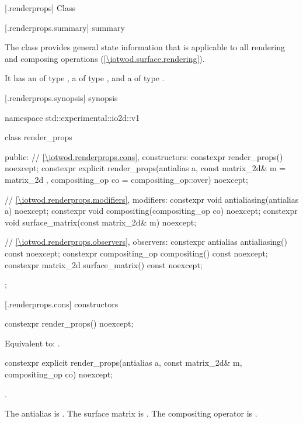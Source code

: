 
 [\iotwod.renderprops] {Class }

 [\iotwod.renderprops.summary] { summary}

\pnum
The  class provides general state information that is applicable to all rendering and composing operations (\ref{\iotwod.surface.rendering}).

\pnum
It has an  of type , a  of type , and a  of type .

 [\iotwod.renderprops.synopsis] { synopsis}

\begin{codeblock}
namespace std::experimental::io2d::v1 {
  class render_props {
  public:
    // \ref{\iotwod.renderprops.cons}, constructors:
    constexpr render_props() noexcept;
    constexpr explicit render_props(antialias a, const matrix_2d& m = 
      matrix_2d{ }, compositing_op co = compositing_op::over) noexcept;
    
    // \ref{\iotwod.renderprops.modifiers}, modifiers:
    constexpr void antialiasing(antialias a) noexcept;
    constexpr void compositing(compositing_op co) noexcept;
    constexpr void surface_matrix(const matrix_2d& m) noexcept;
    
    // \ref{\iotwod.renderprops.observers}, observers:
    constexpr antialias antialiasing() const noexcept;
    constexpr compositing_op compositing() const noexcept;
    constexpr matrix_2d surface_matrix() const noexcept;
  };
}
\end{codeblock}

 [\iotwod.renderprops.cons] { constructors}

\begin{itemdecl}
constexpr render_props() noexcept;
\end{itemdecl}
\begin{itemdescr}
\pnum
\effects
Equivalent to: .
\end{itemdescr}

%
\begin{itemdecl}
constexpr explicit render_props(antialias a, const matrix_2d& m,
  compositing_op co) noexcept;
\end{itemdecl}
\begin{itemdescr}
\pnum
\requires
{}.

\pnum
\effects
The antialias is . The surface matrix is . The compositing operator is .
\end{itemdescr}

